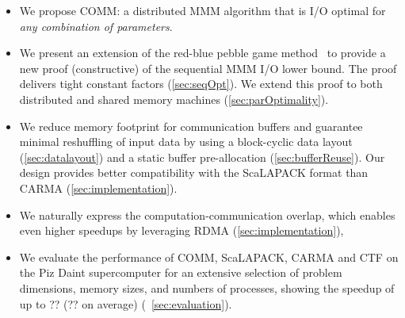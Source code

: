 \documentclass[sigplan,review,anonymous,10pt]{acmart}\settopmatter{printfolios=true,printccs=false,printacmref=false}
\newcommand\mac[1]{\textcolor{red}{[Mac: #1]}}
\begin{document}
\begin{itemize}[leftmargin=1em]
%
\item We propose COMM: a distributed MMM algorithm that is I/O optimal for 
\emph{any combination of parameters}. 
%
%
\item  We present an extension of the red-blue pebble game 
method~\cite{redblue} to provide a new proof (constructive) of
the sequential MMM I/O lower bound.  The proof delivers tight
constant factors (\cref{sec:seqOpt}). We extend this proof to both
distributed and shared memory machines (\cref{sec:parOptimality}).
%
%
\item We reduce memory footprint for communication buffers and guarantee
minimal reshuffling of input data by using a block-cyclic data layout
(\cref{sec:datalayout}) and a static buffer pre-allocation
(\cref{sec:bufferReuse}).  Our design provides better compatibility with the
ScaLAPACK format than CARMA (\cref{sec:implementation}).
%
\item We naturally express the computation-communication overlap, which enables
even higher speedups by leveraging RDMA (\cref{sec:implementation}),
%
\item We evaluate the performance of COMM, ScaLAPACK, CARMA and CTF on the Piz 
Daint supercomputer for an
extensive selection of problem dimensions, memory sizes, and numbers of
processes, showing the speedup of up to ?? (?? on average) 
(~\cref{sec:evaluation}).
%
\end{itemize}

%
\end{document}

